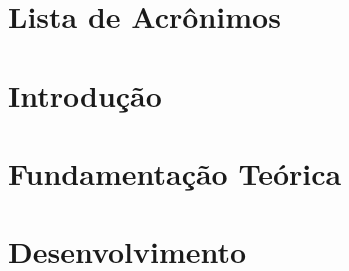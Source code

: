 


\maketitle

\section{Lista de Acrônimos}


\section{Introdução}


\section{Fundamentação Teórica}


\section{Desenvolvimento}



